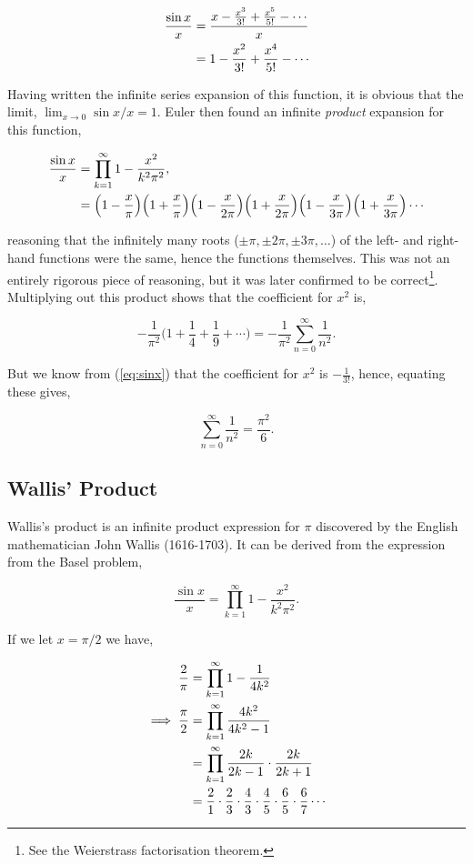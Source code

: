 \documentclass[11pt]{amsart}
\begin{document}
\begin{align}
\frac{\sin x}{x} &= \frac{ x - \frac{x^3}{3!} + \frac{x^5}{5!} - \cdots}{x}  \notag \\
&=  1 - \frac{x^2}{3!} + \frac{x^4}{5!} - \cdots \label{eq:sinx}
\end{align}

Having written the infinite series expansion of this function, it is obvious that the limit, $\lim_{x\to 0} \sin x / x = 1$. Euler then found an infinite \emph{product} expansion for this function,

\begin{align}
\frac{\sin x}{x} &= \prod_{k=1}^{\infty}1 - \frac{x^2}{k^2\pi^2}, \notag \\
&= \Big(1 - \frac{x}{\pi}\Big)\Big(1 + \frac{x}{\pi}\Big)\Big(1 - \frac{x}{2\pi}\Big)\Big(1 + \frac{x}{2\pi}\Big)\Big(1 - \frac{x}{3\pi}\Big)\Big(1 + \frac{x}{3\pi}\Big)\cdots \notag
\end{align}

reasoning that the infinitely many roots ($\pm\pi, \pm2\pi, \pm3\pi, \dots $) of the left- and right-hand functions were the same, hence the functions themselves. This was not an entirely rigorous piece of reasoning, but it was later confirmed to be correct\footnote{See the Weierstrass factorisation theorem.}. Multiplying out this product shows that the coefficient for $x^2$ is,

$$
-\frac{1}{\pi^2}\Big(1 + \frac{1}{4} + \frac{1}{9} + \cdots \Big)= -\frac{1}{\pi^2}\sum_{n=0}^{\infty}\frac{1}{n^2}.
$$

But we know from (\ref{eq:sinx}) that the coefficient for $x^2$ is $-\frac{1}{3!}$, hence, equating these gives,

$$
\sum_{n=0}^{\infty}\frac{1}{n^2} = \frac{\pi^2}{6}.
$$

\subsection{Wallis' Product}

Wallis's product is an infinite product expression for $\pi$ discovered by the English mathematician John Wallis (1616-1703). It can be derived from the expression from the Basel problem,

$$
\frac{\sin x}{x} = \prod_{k=1}^{\infty}1 - \frac{x^2}{k^2\pi^2}.
$$

If we let $x = \pi/2$ we have,

\begin{align}
\frac{2}{\pi} &= \prod_{k=1}^{\infty}1 - \frac{1}{4k^2} \notag \\
\implies \frac{\pi}{2} &= \prod_{k=1}^{\infty} \frac{4k^2}{4k^2 - 1} \notag \\
&= \prod_{k=1}^{\infty} \frac{2k}{2k - 1} \cdot \frac{2k}{2k + 1} \notag \\
&= \frac{2}{1} \cdot \frac{2}{3} \cdot \frac{4}{3} \cdot \frac{4}{5} \cdot \frac{6}{5} \cdot \frac{6}{7} \cdots \notag
\end{align}
\end{document}
